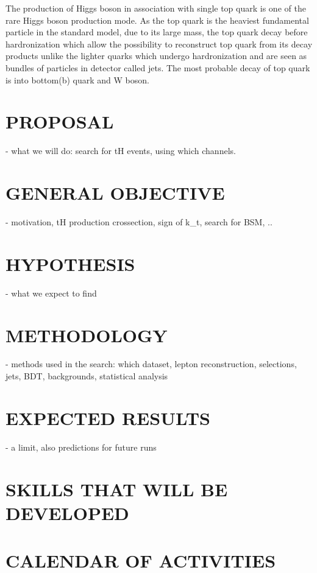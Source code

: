 \documentclass[final,3p]{CSP}
\begin{document}
The production of Higgs boson in association with single top quark is one of the rare Higgs boson production mode. As the top 
quark is the heaviest fundamental particle in the standard model, due to its large mass, the top quark decay before 
hardronization which allow the possibility to reconstruct top quark from its decay products unlike the lighter quarks which 
undergo hardronization and are seen as bundles of particles in detector called jets. The most probable decay of top quark is into 
bottom(b) quark and W boson. 






\section{PROPOSAL}
- what we will do:  search for tH events, using which channels.

\section{GENERAL OBJECTIVE}
- motivation, tH production crossection, sign of k_t, search for BSM, ..


\section{HYPOTHESIS}
- what we expect to find

\section{METHODOLOGY}
- methods used in the search: which dataset,  lepton reconstruction, selections, jets, BDT, backgrounds, statistical analysis

\section{EXPECTED RESULTS}
- a limit, also predictions for future runs


\cleardoublepage



\appendix
\section{SKILLS THAT WILL BE DEVELOPED}

\section{CALENDAR OF ACTIVITIES}
\end{document}
